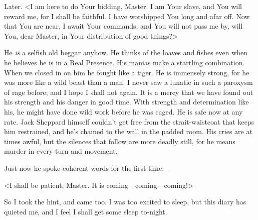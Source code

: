\begin{diary}{Later.}
<I am here to do Your bidding, Master. I am Your slave, and You will reward me, for I shall be faithful. I have worshipped You long and afar off. Now that You are near, I await Your commands, and You will not pass me by, will You, dear Master, in Your distribution of good things?>

He \textit{is} a selfish old beggar anyhow. He thinks of the loaves and fishes even when he believes he is in a Real Presence. His manias make a startling combination. When we closed in on him he fought like a tiger. He is immensely strong, for he was more like a wild beast than a man. I never saw a lunatic in such a paroxysm of rage before; and I hope I shall not again. It is a mercy that we have found out his strength and his danger in good time. With strength and determination like his, he might have done wild work before he was caged. He is safe now at any rate. Jack Sheppard himself couldn't get free from the strait-waistcoat that keeps him restrained, and he's chained to the wall in the padded room. His cries are at times awful, but the silences that follow are more deadly still, for he means murder in every turn and movement.

Just now he spoke coherent words for the first time:—

<I shall be patient, Master. It is coming—coming—coming!>

So I took the hint, and came too. I was too excited to sleep, but this diary has quieted me, and I feel I shall get some sleep to-night.
\end{diary}
